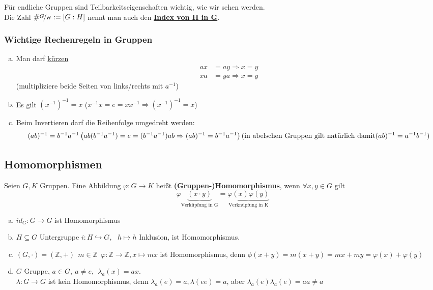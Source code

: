 \documentclass[a4paper, pagesize=pdftex, pdftex, twoside, headsepline, index=totoc,toc=listof, fontsize=10pt, cleardoublepage=empty, headinclude, DIV=13, BCOR=13mm]{scrartcl}
\newcommand{\bet}[1]{\uline{\textbf{#1}}} %
\newcommand{\Index}[1]{\uline{\textbf{#1}}\index{#1}} %
\newcommand{\enbrace}[1]{\ensuremath{\left( #1\right)}}
\begin{document}
Für endliche Gruppen sind Teilbarkeitseigenschaften wichtig, wie wir sehen werden.\\
Die Zahl $\#\nicefrac{G}{H}:=[G:H]$ nennt man auch den \Index{Index von H in G}.

\subsubsection*{Wichtige Rechenregeln in Gruppen}
\begin{enumerate}[(a)]
	\item Man darf \uline{kürzen}
	\begin{equation*}
	\begin{aligned}
		ax &= ay \Rightarrow x=y\\
		xa &= ya \Rightarrow x=y
	\end{aligned}
	\end{equation*}
	(multipliziere beide Seiten von links/rechts mit $a^{-1}$)
	\item Es gilt $(x^{-1})^{-1}=x$   ($x^{-1}x=e=xx^{-1} \Rightarrow (x^{-1})^{-1}=x$)
	\item Beim Invertieren darf die Reihenfolge umgedreht werden:\\
	\[(ab)^{-1}=b^{-1}a^{-1}\\
	\enbrace{ab(b^{-1}a^{-1})=e=(b^{-1}a^{-1})ab \Rightarrow (ab)^{-1}=b^{-1}a^{-1}}\\
	(\text{in abelschen Gruppen gilt natürlich damit} (ab)^{-1}=a^{-1}b^{-1} )
	\]
\end{enumerate}
\subsection{Homomorphismen}
\label{sub:homomorphismen}
Seien $G,K$ Gruppen. Eine Abbildung $\varphi: G \to K$ heißt \bet{(Gruppen-)Homomorphismus}, wenn $\forall x,y \in G$ gilt
\[\varphi\underbrace{(x\cdot y)}_{\text{Verküpfung in G} } =\underbrace{\varphi(x)\varphi(y)}_{\text{Verknüpfung in K}} \]

\begin{enumerate}[(a)]
	\item $id_G: G \to G$ ist Homomorphismus
	\item $H \subseteq G$ Untergruppe   $i:H \hookrightarrow G,~~~h \mapsto h$ Inklusion, ist Homomorphismus.
	\item $(G,\cdot)=(\mathds{Z},+)~~m\in \mathds{Z} ~~ \varphi:\mathds{Z} \to \mathds{Z}, x\mapsto mx$ ist Homomorphismus, denn $\phi(x+y)=m(x+y)=mx+my=\varphi(x)+\varphi(y)$
	\item $G$ Gruppe, $a \in G,~ a\not= e,~~ \lambda_a(x)=ax$.\\
	$\lambda: G \to G$ ist kein Homomorphismus, denn $\lambda_a(e)=a, \lambda(ee)=a$, aber $\lambda_a(e)\lambda_a(e)=aa\not=a$
\end{enumerate}
\end{document}
